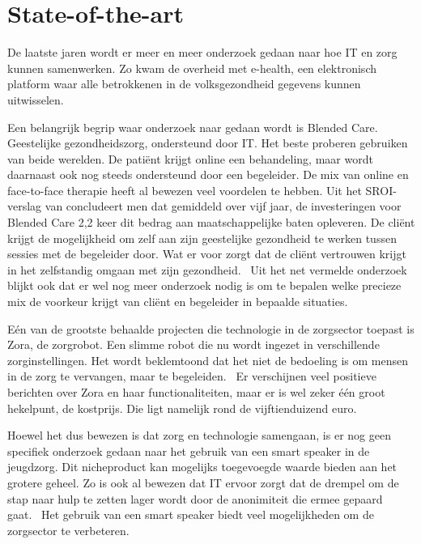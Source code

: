 
\section{State-of-the-art}
\label{sec:state-of-the-art}

De laatste jaren wordt er meer en meer onderzoek gedaan naar hoe IT en zorg kunnen samenwerken. Zo kwam de overheid met e-health, een elektronisch platform waar alle betrokkenen in de volksgezondheid gegevens kunnen uitwisselen.

Een belangrijk begrip waar onderzoek naar gedaan wordt is Blended Care. Geestelijke gezondheidszorg, ondersteund door IT. Het beste proberen gebruiken van beide werelden. De patiënt krijgt online een behandeling, maar wordt daarnaast ook nog steeds ondersteund door een begeleider. De mix van online en face-to-face therapie heeft al bewezen veel voordelen te hebben. Uit het SROI-verslag van \textcite{Stil2016} concludeert men dat gemiddeld over vijf jaar, de investeringen voor Blended Care 2,2 keer dit bedrag aan maatschappelijke baten opleveren. De cliënt krijgt de mogelijkheid om zelf aan zijn geestelijke gezondheid te werken tussen sessies met de begeleider door. Wat er voor zorgt dat de cliënt vertrouwen krijgt in het zelfstandig omgaan met zijn gezondheid.~\autocite{Wentzel2016} Uit het net vermelde onderzoek blijkt ook dat er wel nog meer onderzoek nodig is om te bepalen welke precieze mix de voorkeur krijgt van cliënt en begeleider in bepaalde situaties.

Eén van de grootste behaalde projecten die technologie in de zorgsector toepast is Zora, de zorgrobot. Een slimme robot die nu wordt ingezet in verschillende zorginstellingen. Het wordt beklemtoond dat het niet de bedoeling is om mensen in de zorg te vervangen, maar te begeleiden.~\autocite{Grypdonck2015} Er verschijnen veel positieve berichten over Zora en haar functionaliteiten, maar er is wel zeker één groot hekelpunt, de kostprijs. Die ligt namelijk rond de vijftienduizend euro.~\autocite{Jongejan2016}

Hoewel het dus bewezen is dat zorg en technologie samengaan, is er nog geen specifiek onderzoek gedaan naar het gebruik van een smart speaker in de jeugdzorg. Dit nicheproduct kan mogelijks toegevoegde waarde bieden aan het grotere geheel. Zo is ook al bewezen dat IT ervoor zorgt dat de drempel om de stap naar hulp te zetten lager wordt door de anonimiteit die ermee gepaard gaat.~\autocite{Stil2016} Het gebruik van een smart speaker biedt veel mogelijkheden om de zorgsector te verbeteren.

